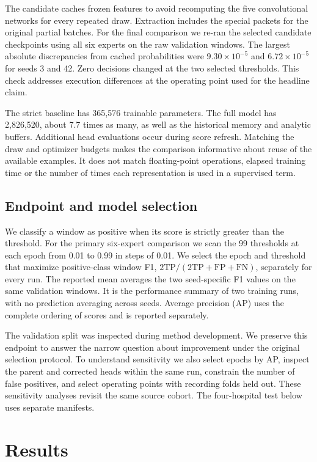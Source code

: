 \documentclass{article}
\begin{document}
The candidate caches frozen features to avoid recomputing the five convolutional networks for every repeated draw. Extraction includes the special packets for the original partial batches. For the final comparison we re-ran the selected candidate checkpoints using all six experts on the raw validation windows. The largest absolute discrepancies from cached probabilities were $9.30\times10^{-5}$ and $6.72\times10^{-5}$ for seeds 3 and 42. Zero decisions changed at the two selected thresholds. This check addresses execution differences at the operating point used for the headline claim.

The strict baseline has 365,576 trainable parameters. The full model has 2,826,520, about 7.7 times as many, as well as the historical memory and analytic buffers. Additional head evaluations occur during score refresh. Matching the draw and optimizer budgets makes the comparison informative about reuse of the available examples. It does not match floating-point operations, elapsed training time or the number of times each representation is used in a supervised term.

\subsection{Endpoint and model selection}
We classify a window as positive when its score is strictly greater than the threshold. For the primary six-expert comparison we scan the 99 thresholds at each epoch from 0.01 to 0.99 in steps of 0.01. We select the epoch and threshold that maximize positive-class window F1, $2\mathrm{TP}/(2\mathrm{TP}+\mathrm{FP}+\mathrm{FN})$, separately for every run. The reported mean averages the two seed-specific F1 values on the same validation windows. It is the performance summary of two training runs, with no prediction averaging across seeds. Average precision (AP) uses the complete ordering of scores and is reported separately.

The validation split was inspected during method development. We preserve this endpoint to answer the narrow question about improvement under the original selection protocol. To understand sensitivity we also select epochs by AP, inspect the parent and corrected heads within the same run, constrain the number of false positives, and select operating points with recording folds held out. These sensitivity analyses revisit the same source cohort. The four-hospital test below uses separate manifests.

\section{Results}
\end{document}
